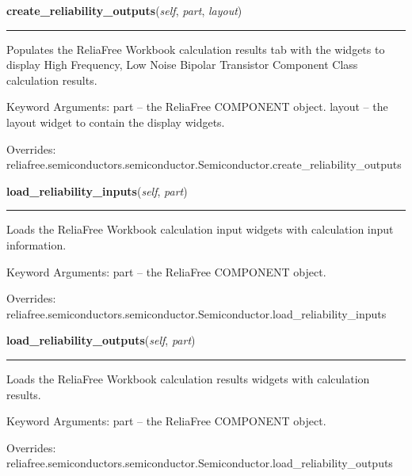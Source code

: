 \hspace{.8\funcindent}\begin{boxedminipage}{\funcwidth}

    \raggedright \textbf{create\_reliability\_outputs}(\textit{self}, \textit{part}, \textit{layout})

    \vspace{-1.5ex}

    \rule{\textwidth}{0.5\fboxrule}
\setlength{\parskip}{2ex}
    Populates the ReliaFree Workbook calculation results tab with the 
    widgets to display High Frequency, Low Noise Bipolar Transistor 
    Component Class calculation results.

    Keyword Arguments: part   -- the ReliaFree COMPONENT object. layout -- 
    the layout widget to contain the display widgets.

\setlength{\parskip}{1ex}
      Overrides: reliafree.semiconductors.semiconductor.Semiconductor.create\_reliability\_outputs

    \end{boxedminipage}

    \vspace{0.5ex}

\hspace{.8\funcindent}\begin{boxedminipage}{\funcwidth}

    \raggedright \textbf{load\_reliability\_inputs}(\textit{self}, \textit{part})

    \vspace{-1.5ex}

    \rule{\textwidth}{0.5\fboxrule}
\setlength{\parskip}{2ex}
    Loads the ReliaFree Workbook calculation input widgets with calculation
    input information.

    Keyword Arguments: part -- the ReliaFree COMPONENT object.

\setlength{\parskip}{1ex}
      Overrides: reliafree.semiconductors.semiconductor.Semiconductor.load\_reliability\_inputs

    \end{boxedminipage}

    \vspace{0.5ex}

\hspace{.8\funcindent}\begin{boxedminipage}{\funcwidth}

    \raggedright \textbf{load\_reliability\_outputs}(\textit{self}, \textit{part})

    \vspace{-1.5ex}

    \rule{\textwidth}{0.5\fboxrule}
\setlength{\parskip}{2ex}
    Loads the ReliaFree Workbook calculation results widgets with 
    calculation results.

    Keyword Arguments: part -- the ReliaFree COMPONENT object.

\setlength{\parskip}{1ex}
      Overrides: reliafree.semiconductors.semiconductor.Semiconductor.load\_reliability\_outputs

    \end{boxedminipage}

